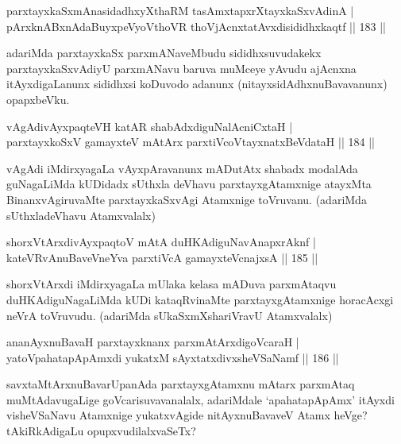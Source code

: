 \begin{shl}
parxtayxkaSxmAnasidadhxyXthaRM tasAmxtapxrXtayxkaSxvAdinA | \\
pArxknABxnAdaBuyxpeVyoV\s thoVR thoV\s jAcnxtatAvxdisididhxkaqtf \hfill||  183 ||  
\end{shl}

\begin{artha}
adariMda parxtayxkaSx parxmANaveMbudu sididhxsuvudakekx parxtayxkaSxvAdiyU parxmANavu baruva muMceye yAvudu ajAcnxna itAyxdigaLanunx sididhxsi koDuvodo adanunx (nitayxsidAdhxnuBavavanunx) opapxbeVku.
\end{artha}


\begin{shl}
vAgAdivAyxpaqteVH katAR shabAdxdiguNalAcniCxtaH | \\
parxtayxkoSxV gamayxteV mAtArx parxtiVcoV\s tayxnatxBeVdataH \hfill||  184 ||  
\end{shl}

\begin{artha}
vAgAdi iMdirxyagaLa vAyxpAravanunx mADutAtx shabadx modalAda guNagaLiMda kUDidadx sUthxla deVhavu parxtayxgAtamxnige atayxMta BinanxvAgiruvaMte parxtayxkaSxvAgi Atamxnige toVruvanu. (adariMda sUthxladeVhavu Atamxvalalx)
\end{artha}

\begin{shl}
shorxVtArxdivAyxpaqtoV mAtA duHKAdiguNavAnapxrAknf | \\
kateVRvAnuBaveVneYva parxtiVcA gamayxteV\s cnajxsA \hfill||  185 ||  
\end{shl}

\begin{artha}
shorxVtArxdi iMdirxyagaLa mUlaka kelasa mADuva parxmAtaqvu duHKAdiguNagaLiMda kUDi kataqRvinaMte parxtayxgAtamxnige horacAcxgi neVrA toVruvudu. (adariMda sUkaSxmXshariVravU Atamxvalalx)
\end{artha}

\begin{shl}
ananAyxnuBavaH parxtayxknanx parxmAtArxdigoVcaraH | \\
yatoV\s pahatapApAmxdi yukatxM sAyxtatxdivxsheVSaNamf \hfill||  186 ||  
\end{shl}

\begin{artha}
savxtaMtArxnuBavarUpanAda parxtayxgAtamxnu mAtarx parxmAtaq muMtAdavugaLige goVcarisuvavanalalx, adariMdale `apahatapApAmx' itAyxdi visheVSaNavu Atamxnige yukatxvAgide nitAyxnuBavaveV Atamx heVge? tAkiRkAdigaLu opupxvudilalxvaSeTx? 
\end{artha}

